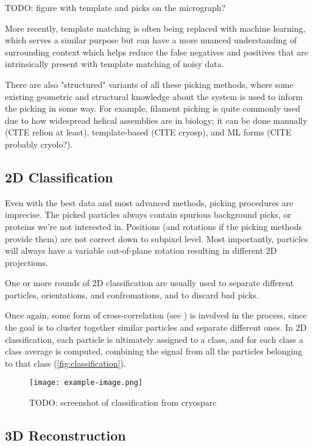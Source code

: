 TODO: figure with template and picks on the micrograph?

More recently, template matching is often being replaced with machine learning, which serves a similar purpose but can have a more nuanced understanding of surrounding context which helps reduce the false negatives and positives that are intrinsically present with template matching of noisy data.

There are also "structured" variants of all these picking methods, where some existing geometric and structural knowledge about the system is used to inform the picking in some way.
For example, filament picking is quite commonly used due to how widespread helical assemblies are in biology; it can be done manually (CITE relion at least), template-based (CITE cryosp), and ML forms (CITE probably cryolo?).

\subsection{2D Classification}\label{classification}

Even with the best data and most advanced methods, picking procedures are imprecise.
The picked particles always contain spurious background picks, or proteins we're not interested in.
Positions (and rotations if the picking methods provide them) are not correct down to subpixel level.
Most importantly, particles will always have a variable out-of-plane rotation resulting in different 2D projections.

One or more rounds of 2D classification are usually used to separate different particles, orientations, and confromations, and to discard bad picks.

Once again, some form of cross-correlation (see ) is involved in the process, since the goal is to cluster together similar particles and separate different ones.
In 2D classification, each particle is ultimately assigned to a class, and for each class a class average is computed, combining the signal from all the particles belonging to that class (\autoref{fig:classification}). 

\begin{figure}[ht]
    \centering
    \texttt{[image: example-image.png]}
    \caption{TODO: screenshot of classification from cryosparc}
    \label{fig:classification}
\end{figure}

\subsection{3D Reconstruction}\label{reconstruction}

